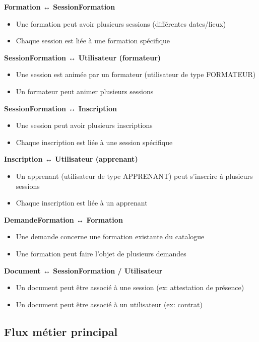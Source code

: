 \documentclass[a4paper,12pt]{article}
\begin{document}
\textbf{Formation ↔ SessionFormation}
\begin{itemize}
    \item Une formation peut avoir plusieurs sessions (différentes dates/lieux)
    \item Chaque session est liée à une formation spécifique
\end{itemize}

\textbf{SessionFormation ↔ Utilisateur (formateur)}
\begin{itemize}
    \item Une session est animée par un formateur (utilisateur de type FORMATEUR)
    \item Un formateur peut animer plusieurs sessions
\end{itemize}

\textbf{SessionFormation ↔ Inscription}
\begin{itemize}
    \item Une session peut avoir plusieurs inscriptions
    \item Chaque inscription est liée à une session spécifique
\end{itemize}

\textbf{Inscription ↔ Utilisateur (apprenant)}
\begin{itemize}
    \item Un apprenant (utilisateur de type APPRENANT) peut s'inscrire à plusieurs sessions
    \item Chaque inscription est liée à un apprenant
\end{itemize}

\textbf{DemandeFormation ↔ Formation}
\begin{itemize}
    \item Une demande concerne une formation existante du catalogue
    \item Une formation peut faire l'objet de plusieurs demandes
\end{itemize}

\textbf{Document ↔ SessionFormation / Utilisateur}
\begin{itemize}
    \item Un document peut être associé à une session (ex: attestation de présence)
    \item Un document peut être associé à un utilisateur (ex: contrat)
\end{itemize}

\subsection{Flux métier principal}
\end{document}
